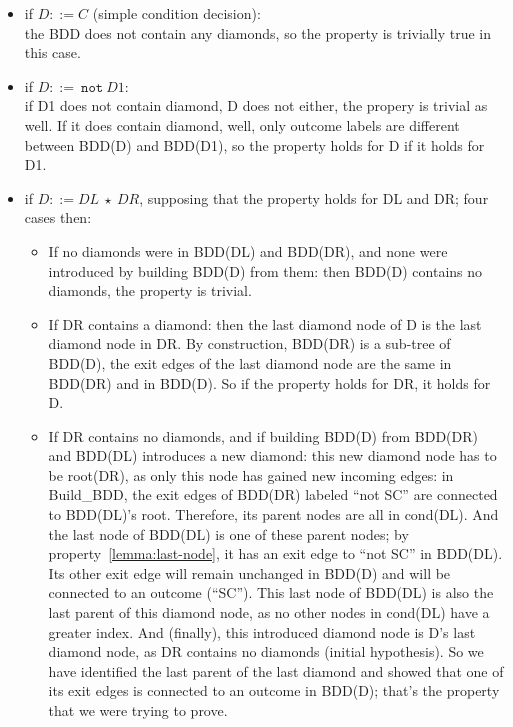 \documentclass[a4paper,12pt,twoside]{article}
\newcommand{\anysc}{\star}
\newcommand{\adanot}{\texttt{not}}
\begin{document}
\begin{itemize}
\item if $D ::= C$ (simple condition decision):\\
  the BDD does not contain any diamonds, so the property is trivially true
  in this case.

\item if $D ::=\ \adanot{} \ D1$:\\
  if D1 does not contain diamond, D does not either, the propery is trivial
  as well. If it does contain diamond, well, only outcome labels are different
  between BDD(D) and BDD(D1), so the property holds for D if it holds for D1.

\item if $D ::= DL \ \anysc{} \ DR$, supposing that the property holds
  for DL and DR; four cases then:

  \begin{itemize}
  \item If no diamonds were in BDD(DL) and BDD(DR), and none were introduced
    by building BDD(D) from them: then BDD(D) contains no diamonds, the
    property is trivial.

  \item If DR contains a diamond: then the last diamond node of D is
    the last diamond node in DR. By construction, BDD(DR) is a
    sub-tree of BDD(D), the exit edges of the last diamond node are
    the same in BDD(DR) and in BDD(D). So if the property holds for
    DR, it holds for D.

  \item If DR contains no diamonds, and if building BDD(D) from
    BDD(DR) and BDD(DL) introduces a new diamond: this new diamond
    node has to be root(DR), as only this node has gained new incoming
    edges: in Build\_BDD, the exit edges of BDD(DR) labeled ``not SC''
    are connected to BDD(DL)'s root. Therefore, its parent nodes are
    all in cond(DL). And the last node of BDD(DL) is one of these
    parent nodes; by property~\ref{lemma:last-node}, it has an exit
    edge to ``not SC'' in BDD(DL). Its other exit edge will remain
    unchanged in BDD(D) and will be connected to an outcome
    (``SC''). This last node of BDD(DL) is also the last parent of
    this diamond node, as no other nodes in cond(DL) have a greater
    index. And (finally), this introduced diamond node is D's last
    diamond node, as DR contains no diamonds (initial hypothesis). So
    we have identified the last parent of the last diamond and showed
    that one of its exit edges is connected to an outcome in BDD(D); that's
    the property that we were trying to prove.


\end{itemize}
\end{itemize}
\end{document}
